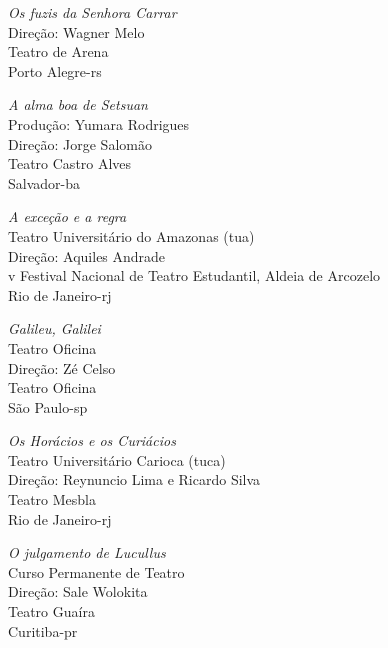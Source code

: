{\it Os fuzis da Senhora Carrar}\\
Direção: Wagner Melo\\
Teatro de Arena\\
Porto Alegre-{\sc rs}

{\it A alma boa de Setsuan}\\
Produção: Yumara Rodrigues\\
Direção: Jorge Salomão\\
Teatro Castro Alves\\
Salvador-{\sc ba}

{\it A exceção e a regra}\\
Teatro Universitário do Amazonas ({\sc tua})\\
Direção: Aquiles Andrade\\
{\sc v} Festival Nacional de Teatro Estudantil, Aldeia de Arcozelo\\
Rio de Janeiro-{\sc rj}

{\it Galileu, Galilei}\\
Teatro Oficina\\
Direção: Zé Celso\\
Teatro Oficina\\
São Paulo-{\sc sp}

{\it Os Horácios e os Curiácios}\\
Teatro Universitário Carioca ({\sc tuca})\\
Direção: Reynuncio Lima e Ricardo Silva\\
Teatro Mesbla\\
Rio de Janeiro-{\sc rj}

{\it O julgamento de Lucullus}\\
Curso Permanente de Teatro\\
Direção: Sale Wolokita\\
Teatro Guaíra\\
Curitiba-{\sc pr}
\stopitemize


